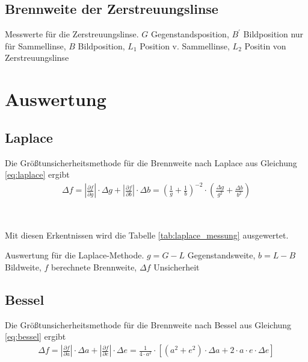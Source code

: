 \documentclass{article}
\begin{document}
\subsection{Brennweite der Zerstreuungslinse}



\begin{table}[H]
\caption{Messwerte für die Zerstreuungslinse. $G$ Gegenstandsposition, $B^\prime$ Bildposition nur für Sammellinse,  $B$ Bildposition, $L_1$ Position v. Sammellinse, $L_2$ Positin von Zerstreuungslinse}
\label{tab:zerstreuungslinse_messung}
\centering

\end{table}




\section{Auswertung}



\subsection{Laplace}

Die Größtunsicherheitsmethode für die Brennweite nach Laplace aus Gleichung \eqref{eq:laplace} ergibt
\begin{align*}
\Delta f = \left|\frac{\partial f}{\partial g}\right| \cdot \Delta g +  \left|\frac{\partial f}{\partial b}\right| \cdot \Delta b  = \left(\frac1g + \frac1b\right)^{-2}\cdot \left(\frac{\Delta g}{g^2} + \frac{\Delta b}{b^2}\right)
\end{align*}

~ 

Mit diesen Erkentnissen wird die Tabelle \ref{tab:laplace_messung} ausgewertet.

\begin{table}[H]
\caption{Auswertung für die Laplace-Methode. $g = G-L$ Gegenstandsweite, $b = L-B$ Bildweite, $f$ berechnete Brennweite, $\Delta f$ Unsicherheit}
\label{tab:laplace_auswertung}
\centering

\end{table}



\subsection{Bessel}

Die Größtunsicherheitsmethode für die Brennweite nach Bessel aus Gleichung \eqref{eq:bessel} ergibt
\begin{align*}
\Delta f = \left|\frac{\partial f}{\partial a}\right| \cdot \Delta a +  \left|\frac{\partial f}{\partial e}\right| \cdot \Delta e  = \frac{1}{4\cdot a^2}\cdot \left[ \left(a^2+e^2\right)\cdot \Delta a + 2\cdot a\cdot e \cdot \Delta e\right]
\end{align*}
\end{document}

